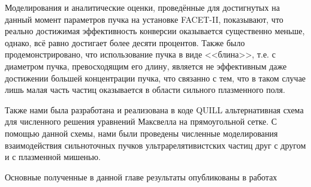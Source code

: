 Моделирования и аналитические оценки, проведённые для достигнутых на данный момент параметров пучка на установке FACET-II, показывают, что реально достижимая эффективность конверсии оказывается существенно меньше, однако, всё равно достигает более десяти процентов.
Также было продемонстрировано, что использование пучка в виде <<блина>>, т.е. с диаметром пучка, превосходящим его длину, является не эффективным даже достижении большей концентрации пучка, что связанно с тем, что в таком случае лишь малая часть частиц оказывается в области сильного плазменного поля.

Также нами была разработана и реализована в коде QUILL альтернативная схема для численного решения уравнений Максвелла на прямоугольной сетке.
С помощью данной схемы, нами были проведены численные моделирования взаимодействия сильноточных пучков ультрарелятивистских частиц друг с другом и с плазменной мишенью.

Основные полученные в данной главе результаты опубликованы в работах~\cite{samsonov2020superluminal, samsonov2021beamstrahlung, filipovic2021effect, samsonov2022simulation,samsonov2020Math, samsonov2021LPHYS}

\FloatBarrier